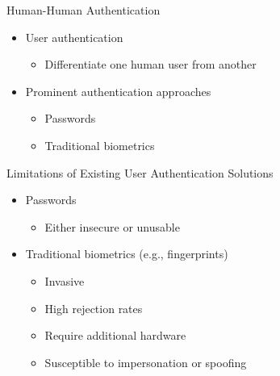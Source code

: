 \begin{frame}{Human-Human Authentication}

\begin{itemize}
\item User authentication 
\begin{itemize}
\item Differentiate one human user from another
\end{itemize}
\item Prominent authentication approaches
\begin{itemize}
\item Passwords
\item Traditional biometrics
\end{itemize}
\end{itemize}
\end{frame}



\begin{frame}{Limitations of Existing User Authentication Solutions}

\begin{itemize}
\item Passwords 
\begin{itemize}
\item Either insecure or unusable 
\end{itemize}
\item Traditional biometrics (e.g., fingerprints)
\begin{itemize}
\item Invasive
\item High rejection rates
\item Require additional hardware
\item Susceptible to impersonation or spoofing 
\end{itemize}
\end{itemize}

\begin{overlayarea}{\textwidth}{0.45\textheight}

\end{overlayarea}

\end{frame}



